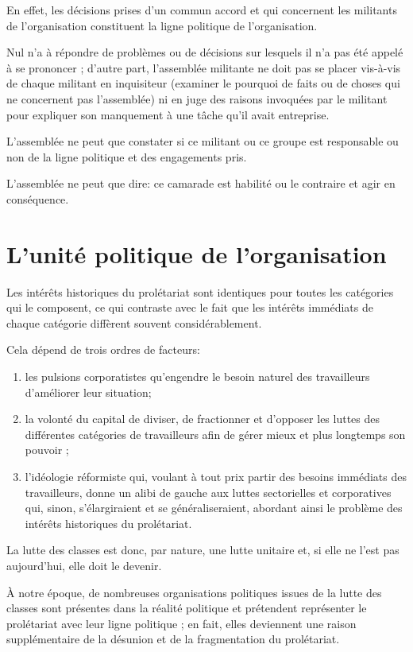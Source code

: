 En effet, les décisions prises d'un commun accord et qui concernent les militants de l'organisation constituent la ligne politique de l'organisation.

Nul n'a à répondre de problèmes ou de décisions sur lesquels il n'a pas été appelé à se prononcer ; d'autre part, l'assemblée militante ne doit pas se placer vis-à-vis de chaque militant en inquisiteur (examiner le pourquoi de faits ou de choses qui ne concernent pas l'assemblée) ni en juge des raisons invoquées par le militant pour expliquer son manquement à une tâche qu'il avait entreprise.

L'assemblée ne peut que constater si ce militant ou ce groupe est responsable ou non de la ligne politique et des engagements pris.

L'assemblée ne peut que dire: ce camarade est habilité ou le contraire et agir en conséquence.

\section{L'unité politique de l'organisation}

Les intérêts historiques du prolétariat sont identiques pour toutes les catégories qui le composent, ce qui contraste avec le fait que les intérêts immédiats de chaque catégorie diffèrent souvent considérablement.

Cela dépend de trois ordres de facteurs:

\begin{enumerate}
\item{} les pulsions corporatistes qu'engendre le besoin naturel des travailleurs d’améliorer leur situation;
\item{} la volonté du capital de diviser, de fractionner et d'opposer les luttes des différentes catégories de travailleurs afin de gérer mieux et plus longtemps son pouvoir ;
\item{} l'idéologie réformiste qui, voulant à tout prix partir des besoins immédiats des travailleurs, donne un alibi de gauche aux luttes sectorielles et corporatives qui, sinon, s'élargiraient et se généraliseraient, abordant ainsi le problème des intérêts historiques du prolétariat.
\end{enumerate}

La lutte des classes est donc, par nature, une lutte unitaire et, si elle ne l'est pas aujourd'hui, elle doit le devenir.

À notre époque, de nombreuses organisations politiques issues de la lutte des classes sont présentes dans la réalité politique et prétendent représenter le prolétariat avec leur ligne politique ; en fait, elles deviennent une raison supplémentaire de la désunion et de la fragmentation du prolétariat.

